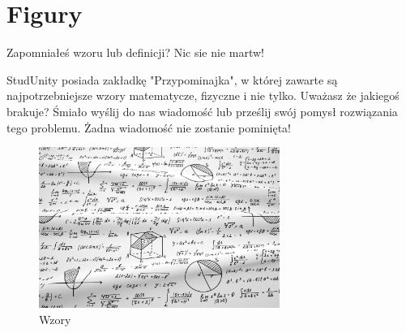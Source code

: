 \section{Figury}

\noindent Zapomniałeś wzoru lub definicji? Nic sie nie martw! 

\maketitle StudUnity posiada zakładkę "Przypominajka", w której zawarte są najpotrzebniejsze wzory matematycze, fizyczne i nie tylko. Uważasz że jakiegoś brakuje? Śmiało wyślij do nas wiadomość lub prześlij swój pomysł rozwiązania tego problemu. Żadna wiadomość nie zostanie pominięta!


\begin{figure}[htbp]
    \centering
    \includegraphics[width=0.7\textwidth]{pictures/wzory.jpg}
    \caption{Wzory}
    \label{fig:Wzory}
\end{figure}